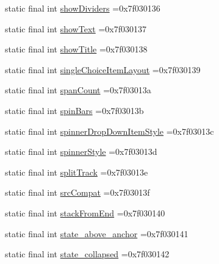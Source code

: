 \begin{DoxyCompactItemize}
static final int \mbox{\hyperlink{classbr_1_1unb_1_1cic_1_1mp_1_1marketmaster_1_1test_1_1R_1_1attr_afa18bc43f70eff93d5825c044c3c09d9}{show\+Dividers}} =0x7f030136
\item 
static final int \mbox{\hyperlink{classbr_1_1unb_1_1cic_1_1mp_1_1marketmaster_1_1test_1_1R_1_1attr_a716e212e6221ae45393566b1e9421ca1}{show\+Text}} =0x7f030137
\item 
static final int \mbox{\hyperlink{classbr_1_1unb_1_1cic_1_1mp_1_1marketmaster_1_1test_1_1R_1_1attr_a308bb9fc57cac12d15dc05436bfbcf88}{show\+Title}} =0x7f030138
\item 
static final int \mbox{\hyperlink{classbr_1_1unb_1_1cic_1_1mp_1_1marketmaster_1_1test_1_1R_1_1attr_a51333ad715f0e3528f09b6feeb7b985e}{single\+Choice\+Item\+Layout}} =0x7f030139
\item 
static final int \mbox{\hyperlink{classbr_1_1unb_1_1cic_1_1mp_1_1marketmaster_1_1test_1_1R_1_1attr_a4b38133fffb8aad6cdc5f7ab2b6f2987}{span\+Count}} =0x7f03013a
\item 
static final int \mbox{\hyperlink{classbr_1_1unb_1_1cic_1_1mp_1_1marketmaster_1_1test_1_1R_1_1attr_aae89a5ae2cb636161cc4ce334a724caa}{spin\+Bars}} =0x7f03013b
\item 
static final int \mbox{\hyperlink{classbr_1_1unb_1_1cic_1_1mp_1_1marketmaster_1_1test_1_1R_1_1attr_a320d5d4066a1198223690bf4efce2b4d}{spinner\+Drop\+Down\+Item\+Style}} =0x7f03013c
\item 
static final int \mbox{\hyperlink{classbr_1_1unb_1_1cic_1_1mp_1_1marketmaster_1_1test_1_1R_1_1attr_a01a6f4281a188453e7dba23263beedce}{spinner\+Style}} =0x7f03013d
\item 
static final int \mbox{\hyperlink{classbr_1_1unb_1_1cic_1_1mp_1_1marketmaster_1_1test_1_1R_1_1attr_a216e803ee02c62ae7ba4962d118bf607}{split\+Track}} =0x7f03013e
\item 
static final int \mbox{\hyperlink{classbr_1_1unb_1_1cic_1_1mp_1_1marketmaster_1_1test_1_1R_1_1attr_ae1a7e00beaf15b5ab0bcafb2bb4d9049}{src\+Compat}} =0x7f03013f
\item 
static final int \mbox{\hyperlink{classbr_1_1unb_1_1cic_1_1mp_1_1marketmaster_1_1test_1_1R_1_1attr_abd1e36b842622d2261f903b9fd75235d}{stack\+From\+End}} =0x7f030140
\item 
static final int \mbox{\hyperlink{classbr_1_1unb_1_1cic_1_1mp_1_1marketmaster_1_1test_1_1R_1_1attr_a065711b3a865b12d998a21b5ed4e1a43}{state\+\_\+above\+\_\+anchor}} =0x7f030141
\item 
static final int \mbox{\hyperlink{classbr_1_1unb_1_1cic_1_1mp_1_1marketmaster_1_1test_1_1R_1_1attr_a89c8bbc5d452bfa6675174b41f6f0500}{state\+\_\+collapsed}} =0x7f030142

\end{DoxyCompactItemize}
